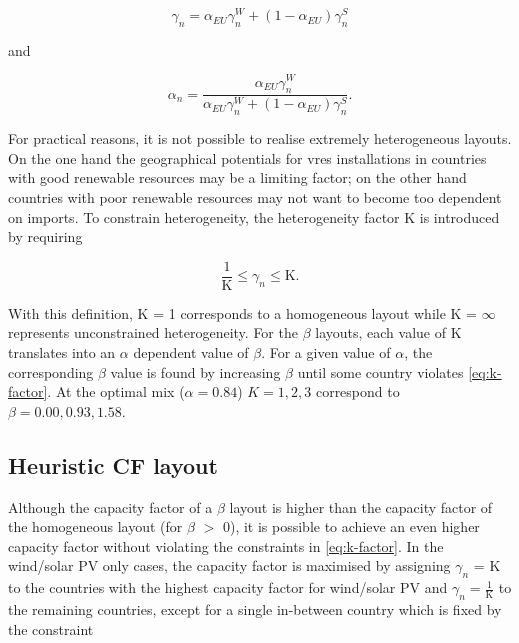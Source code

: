\documentclass[a4paper, 5p, sort&compress]{elsarticle}%
\begin{document}

\begin{equation}
  \label{eq:9}
  \gamma_{n} = \alpha_{EU} \gamma^{W}_{n} + (1-\alpha_{EU}) \gamma^{S}_{n}
\end{equation}

and

\begin{equation}
  \label{eq:9}
  \alpha_{n} = \frac{\alpha_{EU} \gamma_{n}^{W}}{\alpha_{EU} \gamma_{n}^{W} + (1-\alpha_{EU}) \gamma_{n}^{S}} .
\end{equation}


For practical reasons, it is not possible to realise extremely
heterogeneous layouts. On the one hand the geographical potentials for
\gls{vres} installations in countries with good renewable resources may be a limiting factor; on the
other hand countries with poor renewable resources may not want to become too dependent on imports.
To constrain heterogeneity, the heterogeneity
factor K is introduced by requiring

\begin{equation}
  \label{eq:k-factor}
  \frac{1}{\text{K}} \leq \gamma_{n} \leq \text{K} .
\end{equation}

With this definition, K = 1 corresponds to a homogeneous layout while K = $\infty$
represents unconstrained heterogeneity. For the $\beta$
layouts, each value of K translates into an $\alpha$
dependent value of $\beta$.
For a given value of $\alpha$,
the corresponding $\beta$
value is found by increasing $\beta$
until some country violates \cref{eq:k-factor}. At the optimal mix ($\alpha = 0.84$)
$K= 1, 2, 3$ correspond to $\beta = 0.00, 0.93, 1.58$.

\subsection{Heuristic CF layout}
\label{sec:CF-layout}

Although the capacity factor of a $\beta$ layout is higher than the
capacity factor of the homogeneous layout (for $\beta$ $>$ 0), it is
possible to achieve an even higher capacity factor without violating
the constraints in \cref{eq:k-factor}. In the wind/solar PV only
cases, the capacity factor is maximised by assigning $\gamma_{n}$ = K to
the countries with the highest capacity factor for wind/solar PV and
$\gamma_{n} = \frac{1}{\text{K}}$ to the remaining countries, except for a
single in-between country which is fixed by the constraint
\end{document}
